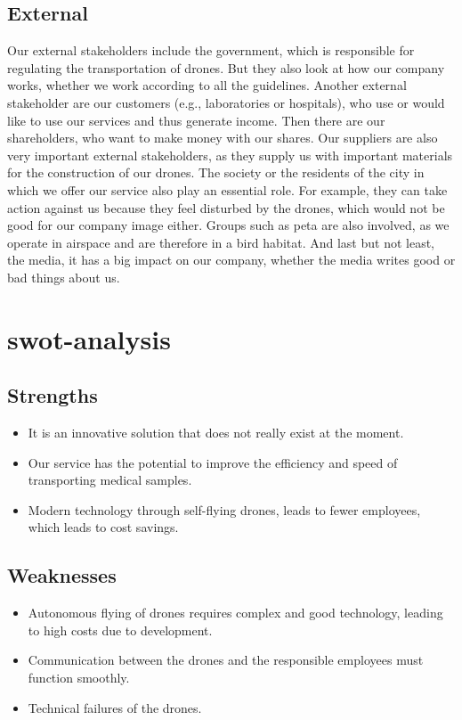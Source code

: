 \subsection{External}
Our external stakeholders include the government, which is responsible for regulating the transportation of drones. But they also look at how our company works, whether we work according to all the guidelines.
\newline
Another external stakeholder are our customers (e.g., laboratories or hospitals), who use or would like to use our services and thus generate income. Then there are our shareholders, who want to make money with our shares.
\newline
Our suppliers are also very important external stakeholders, as they supply us with important materials for the construction of our drones. The society or the residents of the city in which we offer our service also play an essential role. For example, they can take action against us because they feel disturbed by the drones, which would not be good for our company image either. Groups such as \acs{peta} are also involved, as we operate in airspace and are therefore in a bird habitat. And last but not least, the media, it has a big impact on our company, whether the media writes good or bad things about us.
\section{\acs{swot}-analysis}
\subsection{Strengths}
\begin{itemize}
  \item It is an innovative solution that does not really exist at the moment.
  \item Our service has the potential to improve the efficiency and speed of transporting medical samples.
  \item Modern technology through self-flying drones, leads to fewer employees, which leads to cost savings.
\end{itemize}
\subsection{Weaknesses}
\begin{itemize}
  \item Autonomous flying of drones requires complex and good technology, leading to high costs due to development.
  \item Communication between the drones and the responsible employees must function smoothly.
  \item Technical failures of the drones.
\end{itemize}
